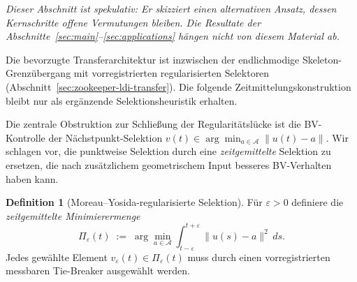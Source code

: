 \documentclass[12pt,a4paper]{article}
\theoremstyle{definition}
\newtheorem{definition}{Definition}[section]
\theoremstyle{plain}
\theoremstyle{remark}
\begin{document}
\emph{Dieser Abschnitt ist spekulativ: Er skizziert einen alternativen Ansatz,
dessen Kernschritte offene Vermutungen bleiben. Die Resultate der
Abschnitte~\ref{sec:main}--\ref{sec:applications} hängen nicht von
diesem Material ab.}

\medskip

Die bevorzugte Transferarchitektur ist inzwischen der endlichmodige
Skeleton-Grenzübergang mit vorregistrierten regularisierten Selektoren
(Abschnitt~\ref{sec:zookeeper-ldi-transfer}). Die folgende
Zeitmittelungskonstruktion bleibt nur als ergänzende Selektionsheuristik
erhalten.

\medskip

Die zentrale Obstruktion zur Schließung der Regularitätslücke ist
die BV-Kontrolle der Nächstpunkt-Selektion
$v(t) \in \arg\min_{a \in \mathcal{A}} \|u(t) - a\|$.  Wir schlagen
vor, die punktweise Selektion durch eine \emph{zeitgemittelte}
Selektion zu ersetzen, die nach zusätzlichem geometrischem Input
besseres BV-Verhalten haben kann.

\begin{definition}[Moreau--Yosida-regularisierte Selektion]
\label{def:my-selection}
Für $\varepsilon > 0$ definiere die \emph{zeitgemittelte
Minimierermenge}
\[
  \Pi_\varepsilon(t)
  \;:=\;
  \arg\min_{a \in \mathcal{A}}
  \int_{t-\varepsilon}^{t+\varepsilon}
  \|u(s) - a\|^2 \, ds.
\]
Jedes gewählte Element $v_\varepsilon(t)\in\Pi_\varepsilon(t)$ muss
durch einen vorregistrierten messbaren Tie-Breaker ausgewählt werden.
\end{definition}
\end{document}
